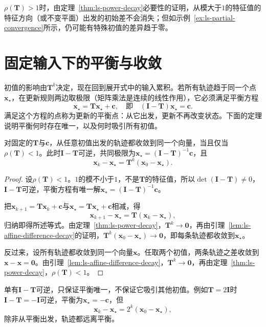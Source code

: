 $\rho(\bm T)>1$时，由定理~\ref{thm:ls-power-decay}必要性的证明，从模大于$1$的特征值的特征方向（或不变平面）出发的初始差不会消失；但如示例~\ref{ex:ls-partial-convergence}所示，仍可能有特殊初值的差异趋于零。

\section{固定输入下的平衡与收敛}
\label{sec:ls-matrix-series-exponential}

初值的影响由$\bm T^k$决定，现在回到展开式中的输入累积。若所有轨迹趋于同一个点$\bm x_\star$，在更新规则两边取极限（矩阵乘法是连续的线性作用），它必须满足平衡方程
\[
 \bm x_\star=\bm T\bm x_\star+\bm c ,\quad\text{即}\quad(\bm I-\bm T)\bm x_\star=\bm c .
\]
满足这个方程的点称为更新的平衡点：从它出发，更新不再改变状态。下面的定理说明平衡何时存在唯一，以及何时吸引所有初值。

\begin{theorem}[共同极限的判据]
\label{thm:ls-affine-common-limit}
对固定的$\bm T$与$\bm c$，从任意初值出发的轨迹都收敛到同一个向量，当且仅当$\rho(\bm T)<1$。此时$\bm I-\bm T$可逆，共同极限为$\bm x_\star=(\bm I-\bm T)^{-1}\bm c$，且
\begin{equation}
 \bm x_k-\bm x_\star=\bm T^k(\bm x_0-\bm x_\star).
 \label{eq:ls-affine-common-limit}
\end{equation}
\end{theorem}
\begin{proof}
设$\rho(\bm T)<1$。$1$的模不小于$1$，不是$\bm T$的特征值，所以$\det(\bm I-\bm T)\neq0$，$\bm I-\bm T$可逆，平衡方程有唯一解$\bm x_\star=(\bm I-\bm T)^{-1}\bm c$。

把$\bm x_{k+1}=\bm T\bm x_k+\bm c$与$\bm x_\star=\bm T\bm x_\star+\bm c$相减，得
\[
 \bm x_{k+1}-\bm x_\star=\bm T(\bm x_k-\bm x_\star),
\]
归纳即得所述等式。由定理~\ref{thm:ls-power-decay}，$\bm T^k\to\bm0$，再由引理~\ref{lem:ls-affine-difference-decay}的证明，$\bm T^k(\bm x_0-\bm x_\star)\to\bm0$，即每条轨迹都收敛到$\bm x_\star$。

反过来，设所有轨迹都收敛到同一个向量$\bm x$。任取两个初值，两条轨迹之差收敛到$\bm x-\bm x=\bm0$。由引理~\ref{lem:ls-affine-difference-decay}，$\bm T^k\to\bm0$，再由定理~\ref{thm:ls-power-decay}，$\rho(\bm T)<1$。
\end{proof}
单有$\bm I-\bm T$可逆，只保证平衡唯一，不保证它吸引其他初值。例如$\bm T=2\bm I$时$\bm I-\bm T=-\bm I$可逆，平衡为$\bm x_\star=-\bm c$，但
\[
 \bm x_k-\bm x_\star=2^k(\bm x_0-\bm x_\star),
\]
除非从平衡出发，轨迹都远离平衡。

